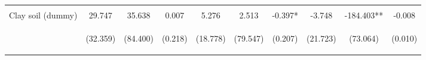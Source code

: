\begin{center}
\begin{tabular}{lccccccccc}
\vspace{4pt} & \begin{footnotesize}[0.887]\end{footnotesize} & \begin{footnotesize}[0.142]\end{footnotesize} & \begin{footnotesize}[0.308]\end{footnotesize} & \begin{footnotesize}[0.577]\end{footnotesize} & \begin{footnotesize}[0.584]\end{footnotesize} & \begin{footnotesize}[0.027]\end{footnotesize} & \begin{footnotesize}[0.699]\end{footnotesize} & \begin{footnotesize}[0.294]\end{footnotesize} & \begin{footnotesize}[0.000]\end{footnotesize} \\
Clay soil (dummy) & 29.747 & 35.638 & 0.007 & 5.276 & 2.513 & -0.397* & -3.748 & -184.403** & -0.008 \\
 & \begin{footnotesize}(32.359)\end{footnotesize} & \begin{footnotesize}(84.400)\end{footnotesize} & \begin{footnotesize}(0.218)\end{footnotesize} & \begin{footnotesize}(18.778)\end{footnotesize} & \begin{footnotesize}(79.547)\end{footnotesize} & \begin{footnotesize}(0.207)\end{footnotesize} & \begin{footnotesize}(21.723)\end{footnotesize} & \begin{footnotesize}(73.064)\end{footnotesize} & \begin{footnotesize}(0.010)\end{footnotesize} \\

\end{tabular}
\end{center}
